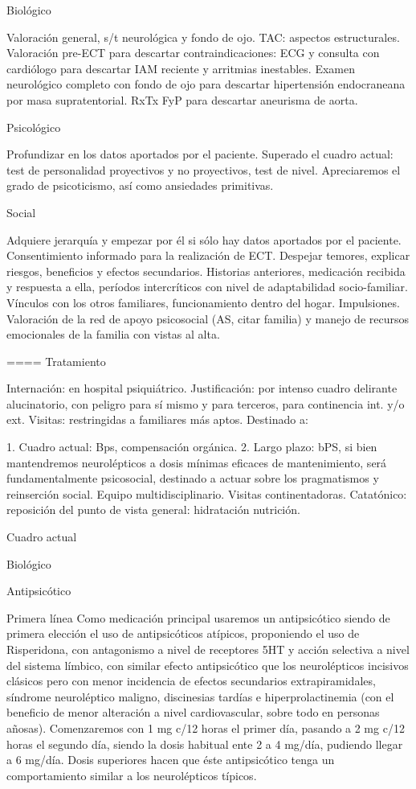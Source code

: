 Biológico

Valoración general, s/t neurológica y fondo de ojo. TAC: aspectos estructurales. Valoración pre-ECT para descartar contraindicaciones: ECG y consulta con cardiólogo para descartar IAM reciente y arritmias inestables. Examen neurológico completo con fondo de ojo para descartar hipertensión endocraneana por masa supratentorial. RxTx FyP para descartar aneurisma de aorta.

Psicológico

Profundizar en los datos aportados por el paciente. Superado el cuadro actual: test de personalidad proyectivos y no proyectivos, test de nivel. Apreciaremos el grado de psicoticismo, así como ansiedades primitivas.

Social

Adquiere jerarquía y empezar por él si sólo hay datos aportados por el paciente. Consentimiento informado para la realización de ECT. Despejar temores, explicar riesgos, beneficios y efectos secundarios. Historias anteriores, medicación recibida y respuesta a ella, períodos intercríticos con nivel de adaptabilidad socio-familiar. Vínculos con los otros familiares, funcionamiento dentro del hogar. Impulsiones. Valoración de la red de apoyo psicosocial (AS, citar familia) y manejo de recursos emocionales de la familia con vistas al alta.

==== Tratamiento

Internación: en hospital psiquiátrico. Justificación: por intenso cuadro delirante alucinatorio, con peligro para sí mismo y para terceros, para continencia int. y/o ext. Visitas: restringidas a familiares más aptos. Destinado a:

1. Cuadro actual: Bps, compensación orgánica. 2. Largo plazo: bPS, si bien mantendremos neurolépticos a dosis mínimas eficaces de mantenimiento, será fundamentalmente psicosocial, destinado a actuar sobre los pragmatismos y reinserción social. Equipo multidisciplinario. Visitas continentadoras. Catatónico: reposición del punto de vista general: hidratación nutrición.

Cuadro actual

Biológico

Antipsicótico

Primera línea Como medicación principal usaremos un antipsicótico siendo de primera elección el uso de antipsicóticos atípicos, proponiendo el uso de Risperidona, con antagonismo a nivel de receptores 5HT y acción selectiva a nivel del sistema límbico, con similar efecto antipsicótico que los neurolépticos incisivos clásicos pero con menor incidencia de efectos secundarios extrapiramidales, síndrome neuroléptico maligno, discinesias tardías e hiperprolactinemia (con el beneficio de menor alteración a nivel cardiovascular, sobre todo en personas añosas). Comenzaremos con 1 mg c/12 horas el primer día, pasando a 2 mg c/12 horas el segundo día, siendo la dosis habitual ente 2 a 4 mg/día, pudiendo llegar a 6 mg/día. Dosis superiores hacen que éste antipsicótico tenga un comportamiento similar a los neurolépticos típicos.

